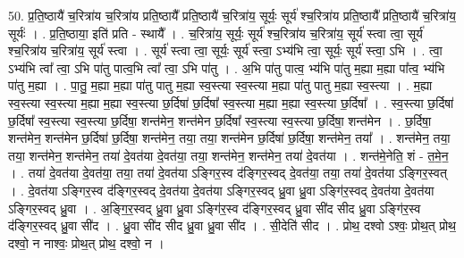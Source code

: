 \documentclass[17pt]{extarticle}
\begin{document}
50. प्र॒ति॒ष्ठायै॑ च॒रित्रा॑य च॒रित्रा॑य प्रति॒ष्ठायै᳚ प्रति॒ष्ठायै॑ च॒रित्रा॑य॒ सूर्यः॒ सूर्य॑ श्च॒रित्रा॑य प्रति॒ष्ठायै᳚ प्रति॒ष्ठायै॑ च॒रित्रा॑य॒ सूर्यः॑ । . प्र॒ति॒ष्ठाया॒ इति॑ प्रति - स्थायै᳚ । . च॒रित्रा॑य॒ सूर्यः॒ सूर्य॑ श्च॒रित्रा॑य च॒रित्रा॑य॒ सूर्य॑ स्त्वा त्वा॒ सूर्य॑ श्च॒रित्रा॑य च॒रित्रा॑य॒ सूर्य॑ स्त्वा । . सूर्य॑ स्त्वा त्वा॒ सूर्यः॒ सूर्य॑ स्त्वा॒ ऽभ्य॑भि त्वा॒ सूर्यः॒ सूर्य॑ स्त्वा॒ ऽभि । . त्वा॒ ऽभ्य॑भि त्वा᳚ त्वा॒ ऽभि पा॑तु पात्व॒भि त्वा᳚ त्वा॒ ऽभि पा॑तु । . अ॒भि पा॑तु पात्व॒ भ्य॑भि पा॑तु म॒ह्या म॒ह्या पा᳚त्व॒ भ्य॑भि पा॑तु म॒ह्या । . पा॒तु॒ म॒ह्या म॒ह्या पा॑तु पातु म॒ह्या स्व॒स्त्या स्व॒स्त्या म॒ह्या पा॑तु पातु म॒ह्या स्व॒स्त्या । . म॒ह्या स्व॒स्त्या स्व॒स्त्या म॒ह्या म॒ह्या स्व॒स्त्या छ॒र्दिषा॑ छ॒र्दिषा᳚ स्व॒स्त्या म॒ह्या म॒ह्या स्व॒स्त्या छ॒र्दिषा᳚ । . स्व॒स्त्या छ॒र्दिषा॑ छ॒र्दिषा᳚ स्व॒स्त्या स्व॒स्त्या छ॒र्दिषा॒ शन्त॑मेन॒ शन्त॑मेन छ॒र्दिषा᳚ स्व॒स्त्या स्व॒स्त्या छ॒र्दिषा॒ शन्त॑मेन । . छ॒र्दिषा॒ शन्त॑मेन॒ शन्त॑मेन छ॒र्दिषा॑ छ॒र्दिषा॒ शन्त॑मेन॒ तया॒ तया॒ शन्त॑मेन छ॒र्दिषा॑ छ॒र्दिषा॒ शन्त॑मेन॒ तया᳚ । . शन्त॑मेन॒ तया॒ तया॒ शन्त॑मेन॒ शन्त॑मेन॒ तया॑ दे॒वत॑या दे॒वत॑या॒ तया॒ शन्त॑मेन॒ शन्त॑मेन॒ तया॑ दे॒वत॑या । . शन्त॑मे॒नेति॒ शं - त॒मे॒न॒ । . तया॑ दे॒वत॑या दे॒वत॑या॒ तया॒ तया॑ दे॒वत॑या ऽङ्गिर॒स्व द॑ङ्गिर॒स्वद् दे॒वत॑या॒ तया॒ तया॑ दे॒वत॑या ऽङ्गिर॒स्वत् । . दे॒वत॑या ऽङ्गिर॒स्व द॑ङ्गिर॒स्वद् दे॒वत॑या दे॒वत॑या ऽङ्गिर॒स्वद् ध्रु॒वा ध्रु॒वा ऽङ्गि॑र॒स्वद् दे॒वत॑या दे॒वत॑या ऽङ्गिर॒स्वद् ध्रु॒वा । . अ॒ङ्गि॒र॒स्वद् ध्रु॒वा ध्रु॒वा ऽङ्गि॑र॒स्व द॑ङ्गिर॒स्वद् ध्रु॒वा सी॑द सीद ध्रु॒वा ऽङ्गि॑र॒स्व द॑ङ्गिर॒स्वद् ध्रु॒वा सी॑द । . ध्रु॒वा सी॑द सीद ध्रु॒वा ध्रु॒वा सी॑द । . सी॒देति॑ सीद । . प्रोथ॒ दश्वो ऽश्वः॒ प्रोथ॒त् प्रोथ॒ दश्वो॒ न नाश्वः॒ प्रोथ॒त् प्रोथ॒ दश्वो॒ न । \newline
\end{document}
